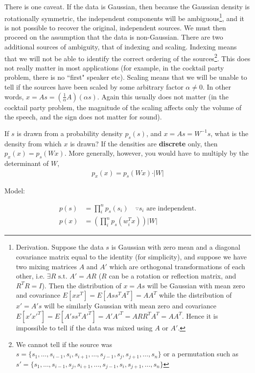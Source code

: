 \documentclass[letterpaper,10pt]{article}
\begin{document}
There is one caveat. If the data is Gaussian, then because the Gaussian density is rotationally symmetric, the independent components will be ambiguous\footnote{Derivation. Suppose the data $s$ is Gaussian with zero mean and a diagonal covariance matrix equal to the identity (for simplicity), and suppose we have two mixing matrices $A$ and $A'$ which are orthogonal transformations of each other, i.e. $\exists R \text{ s.t. } A' = AR$ ($R$ can be a rotation or reflection matrix, and $R^TR=I$). Then the distribution of $x = As$ will be Gaussian with mean zero and covariance $E[xx^T] = E[Ass^TA^T] = AA^T$ while the distribution of $x' = A's$ will be similarly Gaussian with mean zero and covariance $E[x'x'^T] = E[A'ss^TA'^T] = A'A'^T = ARR^TA^T = AA^T$. Hence it is impossible to tell if the data was mixed using $A$ or $A'$.
}, and it is not possible to recover the original, independent sources. We must then proceed on the assumption that the data is non-Gaussian. There are two additional sources of ambiguity, that of indexing and scaling. Indexing means that we will not be able to identify the correct ordering of the sources\footnote{We cannot tell if the source was $s = \{s_1,\ldots, s_{i-1},s_{i},s_{i+1},\ldots, s_{j-1},s_{j},s_{j+1},\ldots, s_n\}$ or a permutation such as $s' = \{s_1,\ldots, s_{i-1},s_{j},s_{i+1},\ldots, s_{j-1},s_{i},s_{j+1},\ldots, s_n\}$}. This does not really matter in most applications (for example, in the cocktail party problem, there is no ``first" speaker etc). Scaling means that we will be unable to tell if the sources have been scaled by some arbitrary factor $\alpha \neq 0$. In other words, $x = As = (\frac{1}{\alpha}A) (\alpha s)$. Again this usually does not matter (in the cocktail party problem, the magnitude of the scaling affects only the volume of the speech, and the sign does not matter for sound).


If $s$ is drawn from a probability density $p_s (s)$, and $x = As = W^{-1}s$, what is the density from which $x$ is drawn? If the densities are \textbf{discrete} only, then $p_x(x) = p_s(Wx)$. More generally, however, you would have to multiply by the determinant of $W$, 
\begin{align}
p_x (x) = p_s (Wx) \cdot \vert W \vert
\end{align}



Model:

\begin{align}
p(s) &= \prod_i^n p_s (s_i) \quad \because s_i \text{ are independent.} \\
p(x) &= \left( \prod_i^n p_s (w_i^Tx) \right) \vert W \vert
\end{align}
\end{document}
